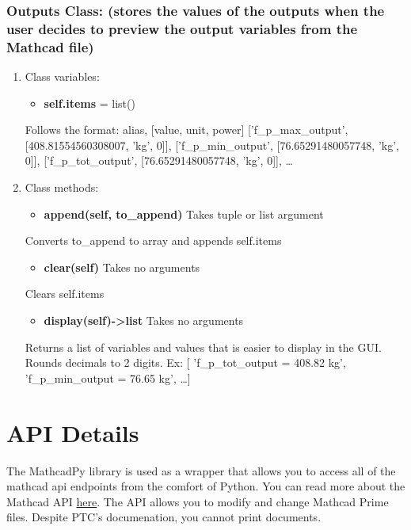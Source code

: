 \documentclass[11pt]{article}
\begin{document}
\subsubsection{Outputs Class: (stores the values of the outputs when the user decides to preview the output variables from the Mathcad file)}
\label{sec:org878e3d3}
\begin{enumerate}
\item Class variables:
\label{sec:orga9d3145}

\begin{itemize}
\item \textbf{self.items} = list()
\end{itemize}
Follows the format:
alias, [value, unit, power]
['f\_p\_max\_output', [408.81554560308007, 'kg', 0]],
['f\_p\_min\_output', [76.65291480057748, 'kg', 0]],
['f\_p\_tot\_output', [76.65291480057748, 'kg', 0]],
\ldots{}
\item Class methods:
\label{sec:org2a2097c}
\begin{itemize}
\item \textbf{append(self, to\_append)} Takes tuple or list argument
\end{itemize}
Converts to\_append to array and appends self.items

\begin{itemize}
\item \textbf{clear(self)} Takes no arguments
\end{itemize}
Clears self.items

\begin{itemize}
\item \textbf{display(self)->list} Takes no arguments
\end{itemize}
Returns a list of variables and values that is easier to display in the GUI. Rounds decimals to 2 digits.
Ex: [ 'f\_p\_tot\_output = 408.82 kg', 'f\_p\_min\_output = 76.65 kg', \ldots{}]
\end{enumerate}

\section{API Details}
\label{sec:orgcccaf9c}

The MathcadPy library is used as a wrapper that allows you to access all of the mathcad api endpoints from the comfort of Python. You can read more about the Mathcad API \href{https://support.ptc.com/help/mathcad/r7.0/en/index.html\#page/PTC\_Mathcad\_Help\%2Fmathcad\_and\_automation\_api.html\%23}{here}. The API allows you to modify and change Mathcad Prime files. Despite PTC's documenation, you cannot print documents.
\end{document}
